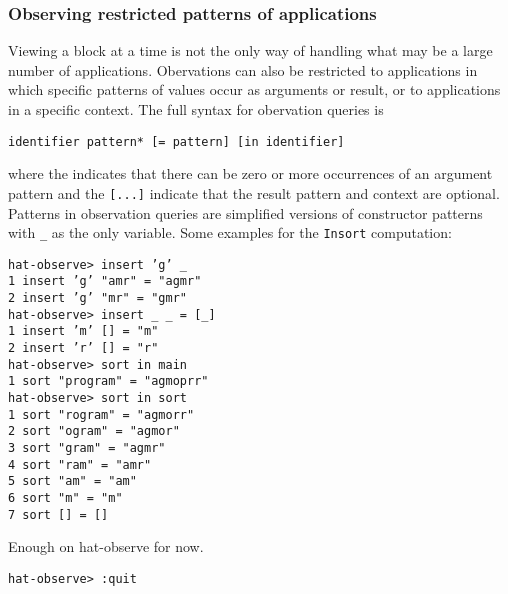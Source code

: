 \documentclass[12pt]{article}
\newcommand{\mkblue}[1]{#1}
\begin{document}
\subsubsection*{Observing restricted patterns of applications}
Viewing a block at a time is not the only way of handling what may be
a large number of applications.  Obervations can also be restricted to
applications in which specific patterns of values occur as arguments or result, or
to applications in a specific context.  The full syntax for obervation
queries is
\begin{tabbing}
{\tt identifier pattern* [= pattern] [in identifier]}
\end{tabbing}
where the {\tt *} indicates that there can be zero or more occurrences of
an argument pattern and the {\tt [...]} indicate that the result pattern and
context are optional.  Patterns in observation queries are simplified
versions of constructor patterns with \verb"_" as the only variable.
Some examples for the {\tt Insort} computation:
\begin{tabbing}
{\tt hat-observe> insert 'g' \verb"_"} \\
{\tt \mkblue{1} insert 'g' "amr" = "agmr"} \\
{\tt \mkblue{2} insert 'g' "mr" = "gmr"} \\
{\tt hat-observe> insert \verb"_" \verb"_" = [\verb"_"]} \\
{\tt \mkblue{1} insert 'm' [] = "m"} \\
{\tt \mkblue{2} insert 'r' [] = "r"} \\
{\tt hat-observe> sort in main} \\
{\tt \mkblue{1} sort "program" = "agmoprr"} \\
{\tt hat-observe> sort in sort} \\
{\tt \mkblue{1} sort "rogram" = "agmorr"} \\
{\tt \mkblue{2} sort "ogram" = "agmor"} \\
{\tt \mkblue{3} sort "gram" = "agmr"} \\
{\tt \mkblue{4} sort "ram" = "amr"} \\
{\tt \mkblue{5} sort "am" = "am"} \\
{\tt \mkblue{6} sort "m" = "m"} \\
{\tt \mkblue{7} sort [] = []}
\end{tabbing}
Enough on hat-observe for now.
\begin{tabbing}
{\tt hat-observe> :quit}
\end{tabbing}
\end{document}
